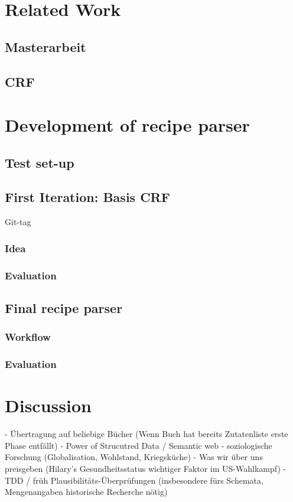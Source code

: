 \documentclass[12pt, twoside]{report}
\begin{document}
\chapter{Related Work}
\cite{REgutGenug}
\section{Masterarbeit}
\section{CRF}


\chapter{Development of recipe parser}

\section{Test set-up}

\section{First Iteration: Basis CRF}
Git-tag
\subsection{Idea}
\subsection{Evaluation}

\section{Final recipe parser}
\subsection{Workflow}
\subsection{Evaluation}

\chapter{Discussion}
- Übertragung auf beliebige Bücher (Wenn Buch hat bereits Zutatenliste erste Phase entfällt)
- Power of Strucutred Data / Semantic web
	- soziologische Forschung (Globalisation, Wohlstand, Kriegsküche)
	- Was wir über uns preisgeben (Hilary's Gesundheitsstatus wichtiger Faktor im US-Wahlkampf)
- TDD / früh Plausibilitäts-Überprüfungen (insbesondere fürs Schemata, Mengenangaben historische Recherche nötig)
\end{document}
